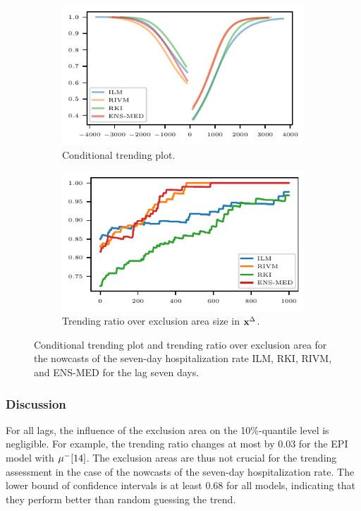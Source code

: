 \begin{figure}
    \centering
    \begin{subfigure}[t]{.48\textwidth}
    \includegraphics{plots/covid_nowcast/40_cond_prob_lag_7}
    \caption{Conditional trending plot.}\label{fig:app-covid-cond-prob-7}
    \end{subfigure}\hfill
    \begin{subfigure}[t]{.48\textwidth}
    \includegraphics{plots/covid_nowcast/40_acc_eps_lag_7}
    \caption{Trending ratio over exclusion area size in $\mathbf{x}^{\Delta}$.}\label{fig:app-covid-trending-ratio-7}
    \end{subfigure}
    \caption{Conditional trending plot and trending ratio over exclusion area for the nowcasts of the seven-day hospitalization rate ILM, RKI, RIVM, and ENS-MED for the lag seven days.}
    \label{fig:app-covid-cond-prob-trending-ratio-7}
\end{figure}



\subsubsection*{Discussion}

For all lags, the influence of the exclusion area on the 10\%-quantile level is negligible.
For example, the trending ratio changes at most by 0.03 for the EPI model with $\mu^-[14]$.
The exclusion areas are thus not crucial for the trending assessment in the case of the nowcasts of the seven-day hospitalization rate.
The lower bound of confidence intervals is at least 0.68 for all models, indicating that they perform better than random guessing the trend.

